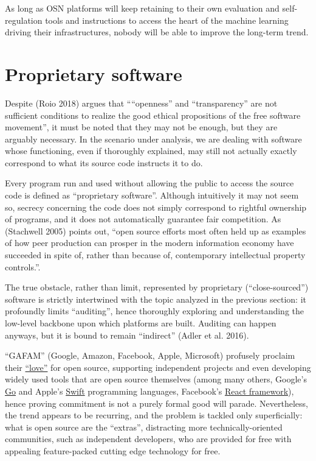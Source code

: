 \documentclass[
  a4paper,
]{book}
\begin{document}
As long as OSN platforms will keep retaining to their own evaluation and self-regulation tools and instructions to access the heart of the machine learning driving their infrastructures, nobody will be able to improve the long-term trend.

\hypertarget{proprietary-software}{%
\section{Proprietary software}\label{proprietary-software}}

Despite {(Roio 2018)} argues that ````openness'' and ``transparency'' are not sufficient conditions to realize the good ethical propositions of the free software movement'', it must be noted that they may not be enough, but they are arguably necessary. In the scenario under analysis, we are dealing with software whose functioning, even if thoroughly explained, may still not actually exactly correspond to what its source code instructs it to do.

Every program run and used without allowing the public to access the source code is defined as ``proprietary software''. Although intuitively it may not seem so, secrecy concerning the code does not simply correspond to rightful ownership of programs, and it does not automatically guarantee fair competition. As {(Stachwell 2005)} points out, ``open source efforts most often held up as examples of how peer production can prosper in the modern information economy have succeeded in spite of, rather than because of, contemporary intellectual property controls.''.

The true obstacle, rather than limit, represented by proprietary (``close-sourced'') software is strictly intertwined with the topic analyzed in the previous section: it profoundly limits ``auditing'', hence thoroughly exploring and understanding the low-level backbone upon which platforms are built. Auditing can happen anyways, but it is bound to remain ``indirect'' {(Adler et al. 2016)}.

``GAFAM'' (Google, Amazon, Facebook, Apple, Microsoft) profusely proclaim their \href{https://pulse.microsoft.com/nl-nl/transform-nl-nl/na/fa1-microsoft-loves-open-source}{``love''} for open source, supporting independent projects and even developing widely used tools that are open source themselves (among many others, Google's \href{https://go.dev}{Go} and Apple's \href{https://developer.apple.com/swift/\#open-source}{Swift} programming languages, Facebook's \href{https://reactjs.org}{React framework}), hence proving commitment is not a purely formal good will parade. Nevertheless, the trend appears to be recurring, and the problem is tackled only superficially: what is open source are the ``extras'', distracting more technically-oriented communities, such as independent developers, who are provided for free with appealing feature-packed cutting edge technology for free.
\end{document}
